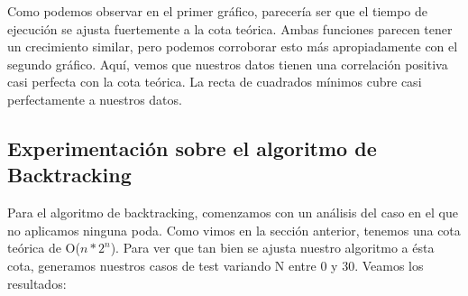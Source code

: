 Como podemos observar en el primer gráfico, parecería ser que el tiempo de ejecución se ajusta fuertemente a la cota teórica. Ambas funciones parecen tener un crecimiento similar, pero podemos corroborar esto más apropiadamente con el segundo gráfico. Aquí, vemos que nuestros datos tienen una correlación positiva casi perfecta con la cota teórica. La recta de cuadrados mínimos cubre casi perfectamente a nuestros datos.
\label{sec:experimentacion}



\subsection{Experimentación sobre el algoritmo de Backtracking}
Para el algoritmo de backtracking, comenzamos con un análisis del caso en el que no aplicamos ninguna poda. Como vimos en la sección anterior, tenemos una cota teórica de O($n*2^{n}$). Para ver que tan bien se ajusta nuestro algoritmo a ésta cota, generamos nuestros casos de test variando N entre 0 y 30. Veamos los resultados:

